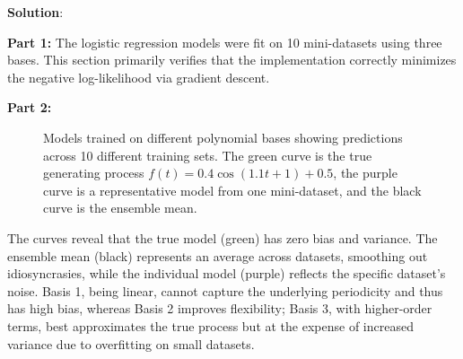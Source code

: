 \documentclass[submit]{../harvardml}
\newenvironment{solution}{
    \vspace{2mm}
    \color{blue}\noindent\textbf{Solution}:
}{}
\begin{document}
\begin{solution}
\begin{tcolorbox}[colback=white,breakable]

\textbf{Part 1:}  
The logistic regression models were fit on 10 mini-datasets using three bases. This section primarily verifies that the implementation correctly minimizes the negative log-likelihood via gradient descent.

\vspace{2mm}
\textbf{Part 2:}  
\begin{figure}[H]
    \centering
    \caption{Models trained on different polynomial bases showing predictions across 10 different training sets. The green curve is the true generating process $f(t)=0.4\cos(1.1t+1)+0.5$, the purple curve is a representative model from one mini-dataset, and the black curve is the ensemble mean.}
\end{figure}

The curves reveal that the true model (green) has zero bias and variance. The ensemble mean (black) represents an average across datasets, smoothing out idiosyncrasies, while the individual model (purple) reflects the specific dataset’s noise. Basis 1, being linear, cannot capture the underlying periodicity and thus has high bias, whereas Basis 2 improves flexibility; Basis 3, with higher-order terms, best approximates the true process but at the expense of increased variance due to overfitting on small datasets.


\end{tcolorbox}
\end{solution}
\end{document}
